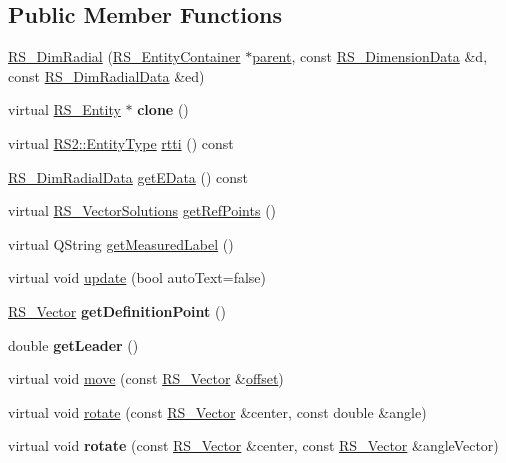 \subsection*{Public Member Functions}
\begin{DoxyCompactItemize}
\item 
\hyperlink{classRS__DimRadial_abd50c542715c9abd6688016148bccfd6}{R\-S\-\_\-\-Dim\-Radial} (\hyperlink{classRS__EntityContainer}{R\-S\-\_\-\-Entity\-Container} $\ast$\hyperlink{classRS__Entity_a80358a8d2fc6739a516a278dc500b49f}{parent}, const \hyperlink{classRS__DimensionData}{R\-S\-\_\-\-Dimension\-Data} \&d, const \hyperlink{classRS__DimRadialData}{R\-S\-\_\-\-Dim\-Radial\-Data} \&ed)
\item 
\hypertarget{classRS__DimRadial_aef9c7a33c682438b68f572c08e3b1f58}{virtual \hyperlink{classRS__Entity}{R\-S\-\_\-\-Entity} $\ast$ {\bfseries clone} ()}\label{classRS__DimRadial_aef9c7a33c682438b68f572c08e3b1f58}

\item 
virtual \hyperlink{classRS2_a8f26d1b981e1e85cff16738b43337e6a}{R\-S2\-::\-Entity\-Type} \hyperlink{classRS__DimRadial_ae4d1a722615668816e39265239bff096}{rtti} () const 
\item 
\hyperlink{classRS__DimRadialData}{R\-S\-\_\-\-Dim\-Radial\-Data} \hyperlink{classRS__DimRadial_a526506bd68eaa0736153e28895e31835}{get\-E\-Data} () const 
\item 
virtual \hyperlink{classRS__VectorSolutions}{R\-S\-\_\-\-Vector\-Solutions} \hyperlink{classRS__DimRadial_a1b16066a1e60245b2374d2dc8c942698}{get\-Ref\-Points} ()
\item 
virtual Q\-String \hyperlink{classRS__DimRadial_a460595303b093d98ce4be29e7910a163}{get\-Measured\-Label} ()
\item 
virtual void \hyperlink{classRS__DimRadial_ad58d22ce2015fce434238826d9b0e019}{update} (bool auto\-Text=false)
\item 
\hypertarget{classRS__DimRadial_a2ab3373d6f33f3e03a3f566dde784d25}{\hyperlink{classRS__Vector}{R\-S\-\_\-\-Vector} {\bfseries get\-Definition\-Point} ()}\label{classRS__DimRadial_a2ab3373d6f33f3e03a3f566dde784d25}

\item 
\hypertarget{classRS__DimRadial_a5ff32ba5e871476bdca48fa97e49711f}{double {\bfseries get\-Leader} ()}\label{classRS__DimRadial_a5ff32ba5e871476bdca48fa97e49711f}

\item 
virtual void \hyperlink{classRS__DimRadial_ae240dec9ba97c2664a5a118996dddeef}{move} (const \hyperlink{classRS__Vector}{R\-S\-\_\-\-Vector} \&\hyperlink{classRS__Entity_aa296d21b9aac99161d386ce2f60f0fea}{offset})
\item 
virtual void \hyperlink{classRS__DimRadial_ac11868c4afaef494256d3785d8cd94bf}{rotate} (const \hyperlink{classRS__Vector}{R\-S\-\_\-\-Vector} \&center, const double \&angle)
\item 
\hypertarget{classRS__DimRadial_a2f7d9aac76cdc55a1b9c1475c46038b5}{virtual void {\bfseries rotate} (const \hyperlink{classRS__Vector}{R\-S\-\_\-\-Vector} \&center, const \hyperlink{classRS__Vector}{R\-S\-\_\-\-Vector} \&angle\-Vector)}\label{classRS__DimRadial_a2f7d9aac76cdc55a1b9c1475c46038b5}


\end{DoxyCompactItemize}

